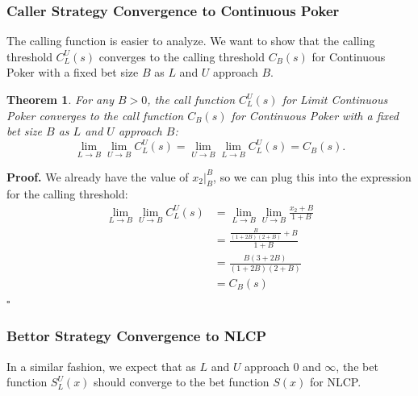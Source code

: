 \documentclass[a4paper,12pt]{article}
\theoremstyle{plain}
\newtheorem{theorem}{Theorem}[section]
\theoremstyle{definition}
\newenvironment{customproof}[1][Proof]{\noindent\textbf{#1.} }{\hfill$\square$\vspace{1em}}
\begin{document}
\subsubsection{Caller Strategy Convergence to Continuous Poker}

The calling function is easier to analyze. We want to show that the calling threshold $C_L^U(s)$ converges to the calling threshold $C_B(s)$ for Continuous Poker with a fixed bet size $B$ as $L$ and $U$ approach $B$.

\begin{theorem}
     For any $B > 0$, the call function $C_L^U(s)$ for Limit Continuous Poker converges to the call function $C_B(s)$ for Continuous Poker with a fixed bet size $B$ as $L$ and $U$ approach $B$:
\[
\lim_{L \to B} \lim_{U \to B} C_L^U(s) = \lim_{U \to B} \lim_{L \to B} C_L^U(s) = C_B(s).
\]
\end{theorem}

\begin{customproof}
We already have the value of $x_2|_B^B$, so we can plug this into the expression for the calling threshold:
\begin{align*}
    \lim_{L \to B} \lim_{U \to B} C_L^U(s) & = \lim_{L \to B} \lim_{U \to B} \frac{x_2+B}{1+B} \\
    & = \frac{\frac{B}{(1+2B)(2+B)} + B}{1+B} \\
    & = \frac{B(3+2B)}{(1+2B)(2+B)} \\
    & = C_B(s)
\end{align*}
\end{customproof}

\subsubsection{Bettor Strategy Convergence to NLCP}

In a similar fashion, we expect that as $L$ and $U$ approach $0$ and $\infty$, the bet function $S_L^U(x)$ should converge to the bet function $S(x)$ for NLCP.
\end{document}

